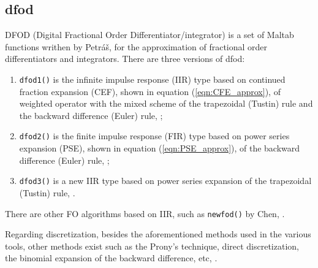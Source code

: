 \documentclass[11pt]{tCON2e}
\theoremstyle{plain}\newtheorem{theorem}{Theorem}
\theoremstyle{definition}
\theoremstyle{remark}
\begin{document}
\subsection{dfod}
DFOD (Digital Fractional Order Differentiator/integrator) is a set of Maltab functions writhen by Petr\'{a}\v{s}, for the approximation of fractional order differentiators and integrators.
There are three versions of dfod:
\begin{enumerate}
    \item {\tt dfod1()} is the infinite impulse response (IIR) type based on continued fraction expansion (CEF), shown in equation (\ref{eqn:CFE_approx}), of weighted operator with the mixed scheme of the trapezoidal (Tustin) rule and the backward difference (Euler) rule, \cite{ref:Petras_dfod1};
        
    \item {\tt dfod2()} is the finite impulse response (FIR) type based on power series expansion (PSE), shown in equation (\ref{eqn:PSE_approx}), of the backward difference (Euler) rule, \cite{ref:Petras_dfod2};
        
    \item {\tt dfod3()} is a new IIR type based on power series expansion of the trapezoidal (Tustin) rule, \cite{ref:Petras_dfod3}.
    
\end{enumerate}


\noindent
There are other FO algorithms based on IIR, such as {\tt newfod()} by Chen, \cite{ref:Chen_IIR}.

Regarding discretization, besides the aforementioned methods used in the various tools, other methods exist such as the Prony's technique, direct discretization, the binomial expansion of the backward difference, etc, \cite{ref:book_FO_Riccardo}.
\end{document}
